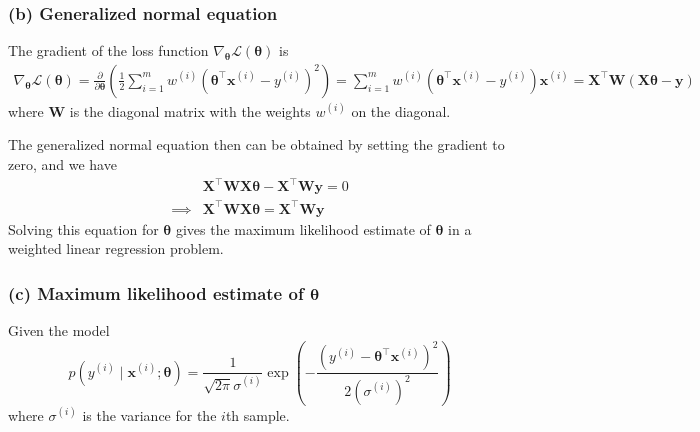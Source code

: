 \clearpage
\subsubsection*{(b) Generalized normal equation}

The gradient of the loss function \( \nabla_{\boldsymbol{\theta}} \mathcal{L}(\boldsymbol{\theta}) \) is
\begin{align*}
    \nabla_{\boldsymbol{\theta}} \mathcal{L}(\boldsymbol{\theta})
    =
    \frac{\partial}{\partial \boldsymbol{\theta}}
    \left(
    \frac{1}{2}
    \sum_{i=1}^{m}
    w^{(i)} {\left(\boldsymbol{\theta}^\top \mathbf{x}^{(i)}-y^{(i)}\right)}^{2}
    \right)
    =
    \sum_{i=1}^{m}
    w^{(i)} \left(\boldsymbol{\theta}^\top \mathbf{x}^{(i)}-y^{(i)}\right) \mathbf{x}^{(i)}
    =
    \mathbf{X}^\top \mathbf{W} (\mathbf{X} \boldsymbol{\theta} - \mathbf{y})
\end{align*}
where \( \mathbf{W} \) is the diagonal matrix with the weights \( w^{(i)} \) on the diagonal.

The generalized normal equation then can be obtained by setting the gradient to zero, and we have
\begin{align*}
     &
    \mathbf{X}^\top \mathbf{W} \mathbf{X} \boldsymbol{\theta} - \mathbf{X}^\top \mathbf{W} \mathbf{y}
    =
    0
    \\
    \implies
     &
    \boxed{
        \mathbf{X}^\top \mathbf{W} \mathbf{X} \boldsymbol{\theta}
        =
        \mathbf{X}^\top \mathbf{W} \mathbf{y}
    }
\end{align*}
Solving this equation for \( \boldsymbol{\theta} \) gives the maximum likelihood estimate of \( \boldsymbol{\theta} \) in a weighted linear regression problem.

\subsubsection*{(c) Maximum likelihood estimate of \( \boldsymbol{\theta} \)}

Given the model
\begin{equation*}
    p\left(y^{(i)} \mid \mathbf{x}^{(i)} ; \boldsymbol{\theta}\right)=\frac{1}{\sqrt{2 \pi} \sigma^{(i)}} \exp \left(-\frac{{\left(y^{(i)}-\boldsymbol{\theta}^{\top} \mathbf{x}^{(i)}\right)}^{2}}{2{\left(\sigma^{(i)}\right)}^{2}}\right)
\end{equation*}
where \( \sigma^{(i)} \) is the variance for the \( i \)th sample.


